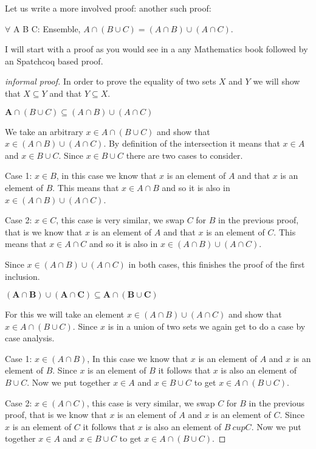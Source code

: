 Let us write a more involved proof: another such proof:
\begin{lemma}[distr]
$\forall$ A B C: Ensemble, $ A\cap(B \cup C) = (A \cap B) \cup (A \cap C).$
\end{lemma}
I will start with a proof as you would see in a any Mathematics book followed by an Spatchcoq based proof.
\begin{proof}[informal proof]
In order to prove the equality of two sets $X$ and $Y$ we will show that $X\subseteq Y$ and that $Y\subseteq X$.

{${\mathbf A\cap(B \cup C) \subseteq  (A \cap B) \cup (A \cap C)}$}

We take an arbitrary $x \in A\cap(B \cup C)$ and show that $ x\in (A \cap B) \cup (A \cap C)$. By definition of the intersection it means that $x \in A $ and $x \in B\cup C$. Since $x \in B\cup C$ there are two cases to consider.

Case 1: $x \in B$, in this case we know that $x$ is an element of $A$ and that $x$ is an element of $B$. This means that $x \in A\cap B$ and so it is also in $ x\in (A \cap B) \cup (A \cap C)$.

Case 2: $x \in C$,  this case is very similar, we swap $C$ for $B$ in the previous proof, that is we know that $x$ is an element of $A$ and that $x$ is an element of $C$. This means that $x \in A\cap C$ and so it is also in $ x\in (A \cap B) \cup (A \cap C)$.

Since  $ x\in (A \cap B) \cup (A \cap C)$ in both cases, this finishes  the proof of the first inclusion.


{$\mathbf {(A \cap B) \cup (A \cap C) \subseteq A\cap(B \cup C)}$}

For this we will take an element $x \in (A \cap B) \cup (A \cap C) $ and show that $ x \in A\cap(B \cup C)$. Since $x$ is in a union of two sets we again get to do a case by case analysis.

Case 1: $x \in (A \cap B)$, In this case we know that $x$ is an element of $A$ and $x$ is an element of $B$. Since $x$ is an element of $B$ it follows that $x$ is also an element of $B\cup C$. Now we put together $x \in A$ and $x \in B\cup C$ to get $x \in A \cap (B\cup C)$.

Case 2: $x \in (A \cap C)$, this case is very similar, we swap $C$ for $B$ in the previous proof, that is we know that $x$ is an element of $A$ and $x$ is an element of $C$. Since $x$ is an element of $C$ it follows that $x$ is also an element of $B\ cup C$. Now we put together $x \in A$ and $x \in B\cup C$ to get $x \in A \cap (B\cup C)$.
\end{proof}



